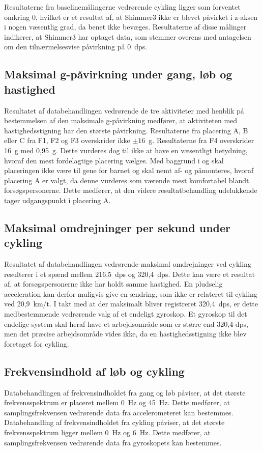 Resultaterne fra baselinemålingerne vedrørende cykling ligger som forventet omkring 0, hvilket er et resultat af, at Shimmer3 ikke er blevet påvirket i z-aksen i nogen væsentlig grad, da benet ikke bevæges. Resultaterne af disse målinger indikerer, at Shimmer3 har optaget data, som stemmer overens med antagelsen om den tilnærmelsesvise påvirkning på 0~dps. 

\subsection{Maksimal g-påvirkning under gang, løb og hastighed} \label{app:maxg}
Resultatet af databehandlingen vedrørende de tre aktiviteter med henblik på bestemmelsen af den maksimale g-påvirkning medfører, at aktiviteten med hastighedsstigning har den største påvirkning. Resultaterne fra placering A, B eller C fra F1, F2 og F3 overskrider ikke $\pm16$~g. Resultaterne fra F4 overskrider 16~g med 0,95~g. Dette vurderes dog til ikke at have en væsentligt betydning, hvoraf den mest fordelagtige placering vælges. Med baggrund i  og  skal placeringen ikke være til gene for barnet og skal nemt af- og påmonteres, hvoraf placering A er valgt, da denne vurderes som værende mest komfortabel blandt forsøgspersonerne. Dette medfører, at den videre resultatbehandling udelukkende tager udgangspunkt i placering A. 

\subsection{Maksimal omdrejninger per sekund under cykling}
Resultatet af databehandlingen vedrørende maksimal omdrejninger ved cykling resulterer i et spænd mellem 216,5~dps og 320,4~dps. Dette kan være et resultat af, at forsøgspersonerne ikke har holdt samme hastighed. En pludselig acceleration kan derfor muligvis give en ændring, som ikke er relateret til cykling ved 20,9~km/t. I takt med at der maksimalt bliver registreret 320,4~dps, er dette medbestemmende vedrørende valg af et endeligt gyroskop. Et gyroskop til det endelige system skal heraf have et arbejdsområde som er større end 320,4 dps, men det præcise arbejdsområde vides ikke, da en hastighedsstigning ikke blev foretaget for cykling.

\subsection{Frekvensindhold af løb og cykling}
Databehandlingen af frekvensindholdet fra gang og løb påviser, at det største frekvensspektrum er placeret mellem 0~Hz og 45~Hz. Dette medfører, at samplingsfrekvensen vedrørende data fra accelerometeret kan bestemmes. \\
Databehandling af frekvensindholdet fra cykling påviser, at det største frekvensspektrum ligger mellem 0~Hz og 6~Hz. Dette medfører, at samplingsfrekvensen vedrørende data fra gyroskopets kan bestemmes. 

